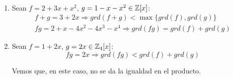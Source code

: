 \begin{ejemplo}\
\begin{enumerate}
    \item Sean $f=2+3x+x^2$, $g=1-x-x^2 \in \mathbb Z[x]$:
    \begin{gather*}
        f+g = 3 + 2x \Longrightarrow grd(f+g) < \max\{grd(f), grd(g)\} \\
        fg = 2+x-4x^2-4x^3-x^4 \Longrightarrow grd(fg) = grd(f) + grd(g)
    \end{gather*}

    \item Sean $f=1+2x$, $g=2x \in \mathbb Z_4[x]$:
    $$fg = 2x \Longrightarrow grd(fg) < grd(f) + grd(g)$$

    Vemos que, en este caso, no se da la igualdad en el producto.
\end{enumerate}
\end{ejemplo}

